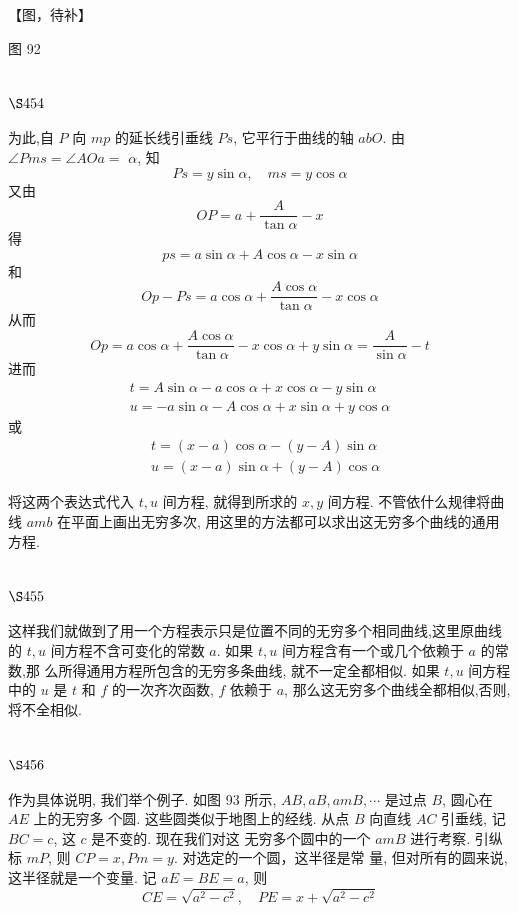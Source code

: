 【图，待补】

图 92

\section{$\S 454$}

为此,自 $P$ 向 $m p$ 的延长线引垂线 $P s$, 它平行于曲线的轴 $a b O$. 由 $\angle P m s=\angle A O a=$ $\alpha$, 知
\[
P s=y \sin \alpha, \quad m s=y \cos \alpha
\]
又由
\[
O P=a+\frac{A}{\tan \alpha}-x
\]
得
\[
p s=a \sin \alpha+A \cos \alpha-x \sin \alpha
\]
和
\[
O p-P s=a \cos \alpha+\frac{A \cos \alpha}{\tan \alpha}-x \cos \alpha
\]
从而
\[
O p=a \cos \alpha+\frac{A \cos \alpha}{\tan \alpha}-x \cos \alpha+y \sin \alpha=\frac{A}{\sin \alpha}-t
\]
进而
\[
\begin{gathered}
t=A \sin \alpha-a \cos \alpha+x \cos \alpha-y \sin \alpha \\
u=-a \sin \alpha-A \cos \alpha+x \sin \alpha+y \cos \alpha
\end{gathered}
\]
或
\[
\begin{aligned}
& t=(x-a) \cos \alpha-(y-A) \sin \alpha \\
& u=(x-a) \sin \alpha+(y-A) \cos \alpha
\end{aligned}
\]

将这两个表达式代入 $t, u$ 间方程, 就得到所求的 $x, y$ 间方程. 不管依什么规律将曲线 $a m b$ 在平面上画出无穷多次, 用这里的方法都可以求出这无穷多个曲线的通用方程.

\section{$\S 455$}

这样我们就做到了用一个方程表示只是位置不同的无穷多个相同曲线,这里原曲线 的 $t, u$ 间方程不含可变化的常数 $a$. 如果 $t, u$ 间方程含有一个或几个依赖于 $a$ 的常数,那 么所得通用方程所包含的无穷多条曲线, 就不一定全都相似. 如果 $t, u$ 间方程中的 $u$ 是 $t$ 和 $f$ 的一次齐次函数, $f$ 依赖于 $a$, 那么这无穷多个曲线全都相似,否则, 将不全相似.

\section{$\S 456$}

作为具体说明, 我们举个例子. 如图 93 所示, $A B, a B, a m B, \cdots$ 是过点 $B$, 圆心在 $A E$ 上的无穷多 个圆. 这些圆类似于地图上的经线. 从点 $B$ 向直线 $A C$ 引垂线, 记 $B C=c$, 这 $c$ 是不变的. 现在我们对这 无穷多个圆中的一个 $a m B$ 进行考察. 引纵标 $m P$, 则 $C P=x, P m=y$. 对选定的一个圆，这半径是常 量, 但对所有的圆来说, 这半径就是一个变量. 记 $a E=B E=a$, 则
\[
C E=\sqrt{a^{2}-c^{2}}, \quad P E=x+\sqrt{a^{2}-c^{2}}
\]

